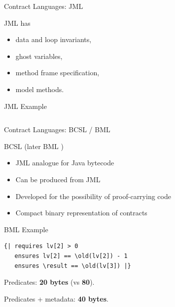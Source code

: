 \documentclass[12pt]{beamer}
\begin{document}
\begin{frame}[fragile]{Contract Languages: \small JML}

  JML \parencite{jml} has

  \begin{itemize}
    \item data and loop invariants,
    \item ghost variables,
    \item method frame specification,
    \item model methods.
  \end{itemize}
\end{frame}

\begin{frame}{JML Example}
  \inputminted[fontsize=\footnotesize]{java}{jmlstack.java}
\end{frame}

\begin{frame}{Contract Languages: \small BCSL / BML}

  BCSL \parencite{bcsl} (later BML \parencite{bml})

  \begin{itemize}
    \item JML analogue for Java bytecode
    \item Can be produced from JML
    \item Developed for the possibility of proof-carrying code
    \item Compact binary representation of contracts
  \end{itemize}
\end{frame}

\begin{frame}[fragile]{BML Example}
  \begin{verbatim}
{| requires lv[2] > 0
   ensures lv[2] == \old(lv[2]) - 1
   ensures \result == \old(lv[3]) |}
  \end{verbatim}

  \vspace{0.25cm}

  Predicates: \textbf{20 bytes} (vs \textbf{80}).

  \vspace{0.25cm}

  Predicates + metadata: \textbf{40 bytes}.
\end{frame}
\end{document}
